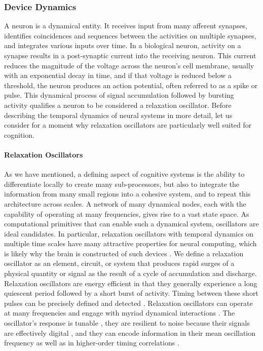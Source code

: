 \documentclass[twocolumn]{article}
\begin{document}
\subsubsection{Device Dynamics}
A neuron is a dynamical entity. It receives input from many afferent synapses, identifies coincidences and sequences between the activities on multiple synapses, and integrates various inputs over time. In a biological neuron, activity on a synapse results in a post-synaptic current into the receiving neuron. This current reduces the magnitude of the voltage across the neuron's cell membrane, usually with an exponential decay in time, and if that voltage is reduced below a threshold, the neuron produces an action potential, often referred to as a spike or pulse. This dynamical process of signal accumulation followed by bursting activity qualifies a neuron to be considered a relaxation oscillator. Before describing the temporal dynamics of neural systems in more detail, let us consider for a moment why relaxation oscillators are particularly well suited for cognition.

\paragraph{Relaxation Oscillators}
As we have mentioned, a defining aspect of cognitive systems is the ability to differentiate locally to create many sub-processors, but also to integrate the information from many small regions into a cohesive system, and to repeat this architecture across scales. A network of many dynamical nodes, each with the capability of operating at many frequencies, gives rise to a vast state space. As computational primitives that can enable such a dynamical system, oscillators are ideal candidates. In particular, relaxation oscillators \cite{st2015,mist1990,soko1993,lued1997,huya2000,bu2006,gile2011,vepe1968,cacl1981} with temporal dynamics on multiple time scales \cite{soko1993} have many attractive properties for neural computing, which is likely why the brain is constructed of such devices \cite{ll1988}. We define a relaxation oscillator as an element, circuit, or system that produces rapid surges of a physical quantity or signal as the result of a cycle of accumulation and discharge. Relaxation oscillators are energy efficient in that they generally experience a long quiescent period followed by a short burst of activity. Timing between these short pulses can be precisely defined and detected \cite{bu2006}. Relaxation oscillators can operate at many frequencies \cite{huya2000,more} and engage with myriad dynamical interactions \cite{lued1997}. The oscillator's response is tunable \cite{huya2000}, they are resilient to noise because their signals are effectively digital \cite{stgo2005}, and they can encode information in their mean oscillation frequency as well as in higher-order timing correlations \cite{pasc1999,thde2001,sase2001,stse2007,brcl2010,haah2015}.
\end{document}
